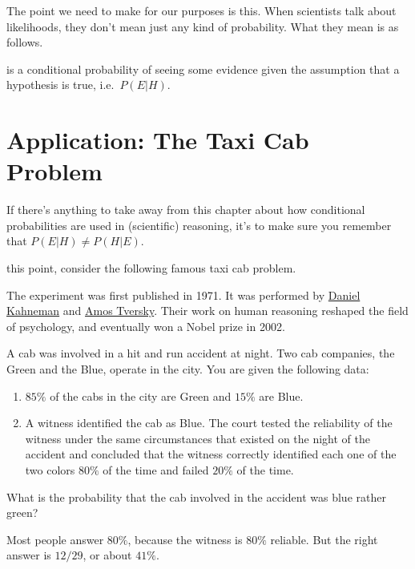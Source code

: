 \documentclass[]{tufte-book}
\providecommand{\tightlist}{%
  \setlength{\itemsep}{0pt}\setlength{\parskip}{0pt}}
\begin{document}
The point we need to make for our purposes is this. When scientists talk about likelihoods, they don't mean just any kind of probability. What they mean is as follows.

 is a conditional probability of seeing some evidence given the assumption that a hypothesis is true, i.e.~\(P(E|H)\).

\hypertarget{application-the-taxi-cab-problem}{%
\section{Application: The Taxi Cab Problem}\label{application-the-taxi-cab-problem}}

If there's anything to take away from this chapter about how conditional probabilities are used in (scientific) reasoning, it's to make sure you remember that \(P(E|H)\neq P(H|E)\).

 this point, consider the following famous taxi cab problem.

\begin{marginfigure}
The experiment was first published in 1971. It was performed by
\href{https://en.wikipedia.org/wiki/Daniel_Kahneman}{Daniel Kahneman}
and \href{https://en.wikipedia.org/wiki/Amos_Tversky}{Amos Tversky}.
Their work on human reasoning reshaped the field of psychology, and
eventually won a Nobel prize in 2002.
\end{marginfigure}

A cab was involved in a hit and run accident at night. Two cab companies, the Green and the Blue, operate in the city. You are given the following data:

\begin{enumerate}
\def\labelenumi{\arabic{enumi}.}
\tightlist
\item
  \(85\%\) of the cabs in the city are Green and \(15\%\) are Blue.
\item
  A witness identified the cab as Blue. The court tested the reliability of the witness under the same circumstances that existed on the night of the accident and concluded that the witness correctly identified each one of the two colors \(80\%\) of the time and failed \(20\%\) of the time.
\end{enumerate}

What is the probability that the cab involved in the accident was blue rather green?

Most people answer \(80\%\), because the witness is \(80\%\) reliable. But the right answer is \(12/29\), or about \(41\%\).
\end{document}
